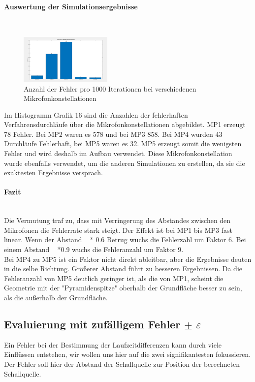 \paragraph{Auswertung der Simulationsergebnisse}\ \\
\begin{figure}
\centering 
\includegraphics[width=0.4\textwidth]{MikroPositionZusammenfassung}
\caption{Anzahl der Fehler pro 1000 Iterationen bei verschiedenen Mikrofonkonstellationen}\label{fig:Anzahl der Fehler pro 1000 Iterationen bei verschiedenen Mikrofonkonstellationen}
\end{figure}

Im Histogramm Grafik 16 sind die Anzahlen der fehlerhaften Verfahrensdurchläufe über die Mikrofonkonstellationen abgebildet. MP1 erzeugt 78 Fehler. Bei MP2 waren es 578 und bei MP3 858. Bei MP4 wurden 43 Durchläufe Fehlerhaft, bei MP5 waren es 32. MP5 erzeugt somit die wenigsten Fehler und wird deshalb im Aufbau verwendet. Diese Mikrofonkonstellation wurde ebenfalls verwendet, um die anderen Simulationen zu erstellen, da sie die exaktesten Ergebnisse versprach.
\paragraph{Fazit}\ \\
Die Vermutung traf zu, dass mit Verringerung des Abstandes zwischen den Mikrofonen die Fehlerrate stark steigt. Der Effekt ist bei MP1 bis MP3 fast linear. Wenn der Abstand ~ * 0.6 Betrug wuchs die Fehlerzahl um Faktor 6. Bei einem Abstand ~ *0.9 wuchs die Fehleranzahl um Faktor 9. \\
Bei MP4 zu MP5 ist ein Faktor nicht direkt ableitbar, aber die Ergebnisse deuten in die selbe Richtung. Größerer Abstand führt zu besseren Ergebnissen.
Da die Fehleranzahl von MP5 deutlich geringer ist, als die von MP1, scheint die Geometrie mit der "Pyramidenspitze" oberhalb der Grundfläche besser zu sein, als die außerhalb der Grundfläche.


\subsection{Evaluierung mit zufälligem Fehler $\pm$ $\varepsilon$}
Ein Fehler bei der Bestimmung der Laufzeitdifferenzen kann durch viele Einflüssen entstehen, wir wollen uns hier auf die zwei signifikantesten fokussieren. Der Fehler soll hier der Abstand der Schallquelle zur Position der berechneten Schallquelle.
